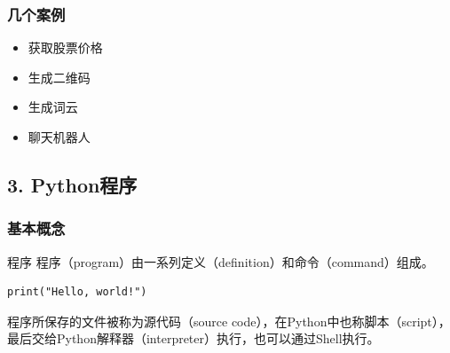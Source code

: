 \documentclass[aspectratio=169, 14pt]{beamer}
\begin{document}
\begin{frame}
	\frametitle{几个案例}
	\begin{itemize}
		\item 获取股票价格
		\item 生成二维码
		\item 生成词云
		\item 聊天机器人
	\end{itemize}
\end{frame}

{
\begin{frame}
	\section{\textcolor{darkmidnightblue}{3. Python程序}}
\end{frame}
}

\begin{frame}[fragile]
	\frametitle{基本概念}
	\begin{exampleblock}{程序}
		程序（program）由一系列定义（definition）和命令（command）组成。
	\end{exampleblock}

	\begin{verbatim}
print("Hello, world!")
  \end{verbatim}

	程序所保存的文件被称为\alert{源代码}（source code），在Python中也称\alert{脚本}（script），最后交给Python\alert{解释器}（interpreter）执行，也可以通过Shell执行。
\end{frame}
\end{document}
